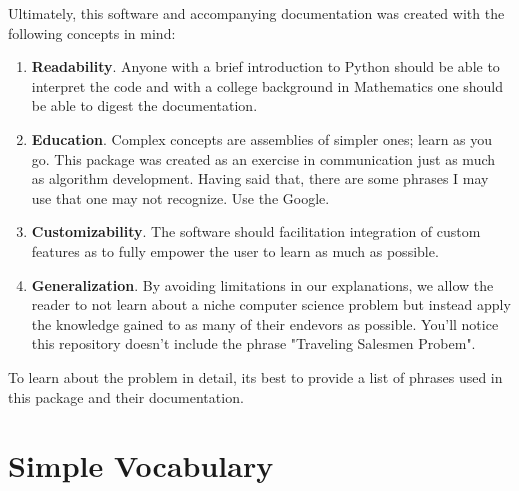 \documentclass[12pt]{article}
\begin{document}
Ultimately, this software and accompanying documentation was created with the following concepts in mind:
\begin{enumerate}
\item \textbf{Readability}.  Anyone with a brief introduction to Python should be able to interpret the code and with a college background in Mathematics one should be able to digest the documentation.
\item  \textbf{Education}.  Complex concepts are assemblies of simpler ones; learn as you go.  This package was created as an exercise in communication just as much as algorithm development.  Having said that, there are some phrases I may use that one may not recognize.  Use the Google.
\item  \textbf{Customizability}.  The software should facilitation integration of custom features as to fully empower the user to learn as much as possible.
\item \textbf{Generalization}.  By avoiding limitations in our explanations, we allow the reader to not learn about a niche computer science problem but instead apply the knowledge gained to as many of their endevors as possible.  You'll notice this repository doesn't include the phrase "Traveling Salesmen Probem".  
\end{enumerate}

To learn about the problem in detail, its best to provide a list of phrases used in this package and their documentation.



\section{Simple Vocabulary}
\end{document}
